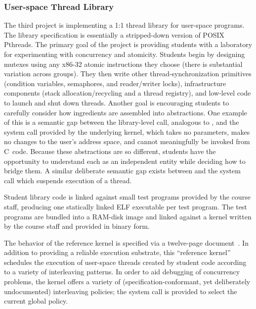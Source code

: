\subsubsection{User-space Thread Library}
The third project is implementing a 1:1 thread library for
user-space programs.
The library specification is essentially a stripped-down
version of POSIX Pthreads.
The primary goal of the project is providing students
with a laboratory for
experimenting with concurrency and atomicity.
Students begin by designing mutexes using any
x86-32 atomic instructions they choose
(there is substantial variation across groups).
They then write other thread-synchronization
primitives (condition variables, semaphores,
and reader/writer locks), infrastructure
components (stack allocation/recycling and
a thread registry),
and low-level code to launch and shut down
threads.
Another goal is encouraging students to carefully
consider how ingredients are assembled into
abstractions.
One example of this is a semantic gap
between the library-level 
call, analogous to ,
and the  system call provided
by the underlying kernel,
which takes no parameters,
makes no changes to the user's address space,
and cannot meaningfully
be invoked from C~code.
Because these abstractions are so different,
students have the opportunity to
understand each as an independent entity while
deciding how to bridge them.
A similar deliberate semantic gap exists between
 and the system call
which suspends execution of a thread.

Student library code is linked against small
test programs provided by the course staff,
producing one statically linked ELF executable
per test program.
The test programs are bundled into a RAM-disk
image and linked against a kernel written by
the course staff
and provided in binary form.

The behavior of the reference kernel is specified
via a twelve-page document~\cite{kspec}.
In addition to providing a reliable execution
substrate,
this ``reference kernel'' schedules
the execution of user-space threads created by
student code according to a variety of
interleaving patterns.
In order to aid debugging of concurrency problems,
the kernel offers a variety of (specification-conformant, yet deliberately undocumented) interleaving policies;
the  system call is provided to select the current global policy.

